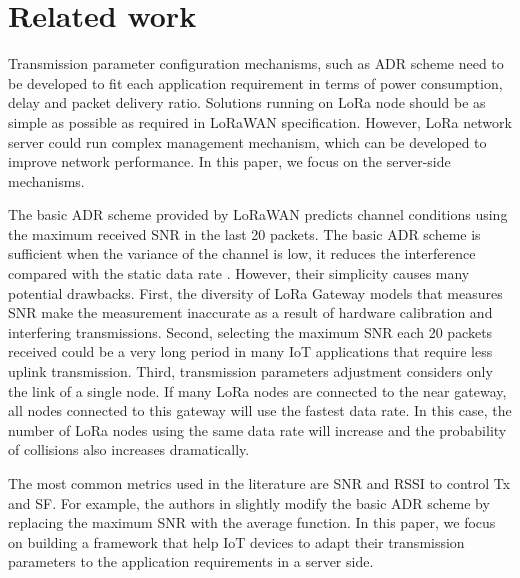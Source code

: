 \section{Related work} \label{sec:Related work}

Transmission parameter configuration mechanisms,
	such as \ac{ADR} scheme need to be developed to fit each application requirement in terms of power consumption,
	delay and packet delivery ratio.
Solutions running on LoRa node should be as simple as possible as required in LoRaWAN specification.
However,
	LoRa network server could run complex management mechanism,
	which can be developed to improve network performance.
In this paper, 
	we focus on the server-side mechanisms.

The basic \ac{ADR} scheme \cite{LorawanSpecification} provided by LoRaWAN predicts channel conditions using the maximum received \ac{SNR} in the last 20 packets.
The basic \ac{ADR} scheme is sufficient when the variance of the channel is low, 
	it reduces the interference compared with the static data rate \cite{bor_lora_2016}\cite{slabicki_adaptive_2018}.
However,
	their simplicity causes many potential drawbacks.
First,
	the diversity of LoRa Gateway models that measures \ac{SNR} make the measurement inaccurate as a result of hardware calibration and interfering transmissions.
Second,
	selecting the maximum \ac{SNR} each 20 packets received could be a very long period in many IoT applications that require less uplink transmission.
Third,
	transmission parameters adjustment considers only the link of a single node.
If many LoRa nodes are connected to the near gateway,
	all nodes connected to this gateway will use the fastest data rate.
In this case,
	the number of LoRa nodes using the same data rate will increase and the probability of collisions also increases dramatically.

The most common metrics used in the literature are \ac{SNR} and \ac{RSSI} to control \ac{Tx} and \ac{SF}.
For example,
	the authors in \cite{slabicki_adaptive_2018} slightly modify the basic \ac{ADR} scheme by replacing the maximum \ac{SNR} with the average function.
In this paper,
	we focus on building a framework that help IoT devices to adapt their transmission parameters to the application requirements in a server side.

